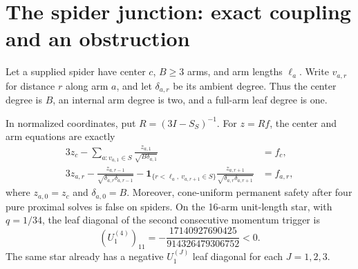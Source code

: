 \documentclass[11pt]{article}
\begin{document}
\section{The spider junction: exact coupling and an obstruction}
\label{sec:spider-junction}

Let a supplied spider have center \(c\), \(B\geq3\) arms, and arm lengths
\(\ell_a\).  Write \(v_{a,r}\) for distance \(r\) along arm \(a\), and let
\(\delta_{a,r}\) be its ambient degree.  Thus the center degree is \(B\), an
internal arm degree is two, and a full-arm leaf degree is one.

\begin{proposition}
\label{prop:spider-center-and-star}
In normalized coordinates, put \(R=(3I-S_S)^{-1}\).  For \(z=Rf\), the
center and arm equations are exactly
\begin{align}
 3z_c-\sum_{a:v_{a,1}\in S}
   \frac{z_{a,1}}{\sqrt{B\delta_{a,1}}}&=f_c,
 \label{eq:spider-center-row}\\
 3z_{a,r}
 -\frac{z_{a,r-1}}{\sqrt{\delta_{a,r}\delta_{a,r-1}}}
 -\mathbf 1_{\{r<\ell_a,\ v_{a,r+1}\in S\}}
  \frac{z_{a,r+1}}{\sqrt{\delta_{a,r}\delta_{a,r+1}}}
 &=f_{a,r},
 \label{eq:spider-arm-row}
\end{align}
where \(z_{a,0}=z_c\) and \(\delta_{a,0}=B\).  Moreover, cone-uniform
permanent safety after four pure proximal solves is false on spiders.  On the
16-arm unit-length star, with \(q=1/34\), the leaf diagonal of the second
consecutive momentum trigger is
\begin{equation}
 (U_1^{(4)})_{11}
 =-\frac{17140927690425}{914326479306752}<0.
 \label{eq:star-four-warmup-witness}
\end{equation}
The same star already has a negative \(U_1^{(J)}\) leaf diagonal for each
\(J=1,2,3\).
\end{proposition}
\end{document}
